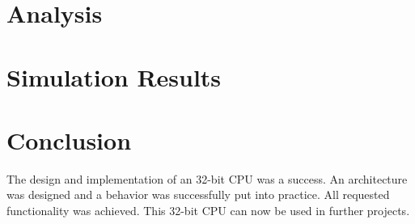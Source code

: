 \documentclass[12pt]{article}
\begin{document}
\section{Analysis}

\section{Simulation Results}


\section{Conclusion}
The design and implementation of an 32-bit CPU was a success. An architecture was designed and a behavior was successfully put into practice. All requested functionality was achieved. This 32-bit CPU can now be used in further projects.
\end{document}
